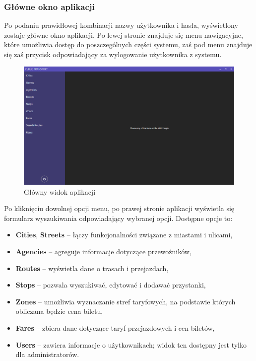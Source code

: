 \documentclass[10pt,a4paper]{article}
\begin{document}
\subsubsection{Główne okno aplikacji}
Po podaniu prawidłowej kombinacji nazwy użytkownika i hasła, wyświetlony zostaje główne okno aplikacji. Po lewej stronie znajduje się menu nawigacyjne, które umożliwia dostęp do poszczególnych części systemu, zaś pod menu znajduje się zaś przycisk odpowiadający za wylogowanie użytkownika z systemu.
\begin{figure}[H]
	\centering
	\includegraphics[width=15cm]{Resources/Images/02_main_window.png}
	\caption{Główny widok aplikacji}
\end{figure}
Po kliknięciu dowolnej opcji menu, po prawej stronie aplikacji wyświetla się formularz wyszukiwania odpowiadający wybranej opcji. Dostępne opcje to:
\begin{itemize}
	\item \textbf{Cities}, \textbf{Streets} -- łączy funkcjonalności związane z miastami i ulicami,
	\item \textbf{Agencies} -- agreguje informacje dotyczące przewoźników,
	\item \textbf{Routes} -- wyświetla dane o trasach i przejazdach,
	\item \textbf{Stops} -- pozwala wyszukiwać, edytować i dodawać przystanki,
	\item \textbf{Zones} -- umożliwia wyznaczanie stref taryfowych, na podstawie których obliczana będzie cena biletu,
	\item \textbf{Fares} -- zbiera dane dotyczące taryf przejazdowych i cen biletów,
	\item \textbf{Users} -- zawiera informacje o użytkownikach; widok ten dostępny jest tylko dla administratorów.
\end{itemize}
\end{document}
